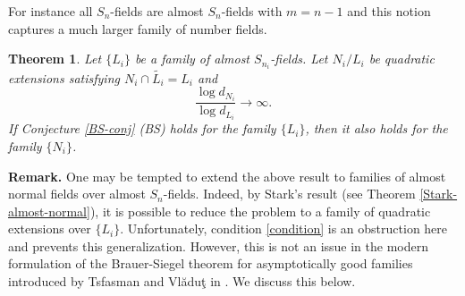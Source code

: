 \documentclass[12pt]{amsart}
\newtheorem{theorem}{Theorem}[section]
\theoremstyle{definition}
\begin{document}
\begin{figure}

\caption{}
\end{figure}

For instance all $S_n$-fields are almost $S_n$-fields with $m=n-1$ and this notion captures a much larger family of number fields.

\begin{theorem}\label{BS-almost-S_n}
   Let $\{L_i\}$ be a family of almost $S_{n_i}$-fields. Let $N_i/L_i$ be quadratic extensions satisfying $N_i\cap \widetilde{L_i} = L_i$ and 
   \begin{equation}\label{condition}
        \frac{\log d_{N_i}}{\log d_{L_i}} \to \infty.
   \end{equation}
    If Conjecture \ref{BS-conj} (BS) holds for the family $\{L_i\}$, then it also holds for the family $\{N_i\}$.
\end{theorem}

{\bf Remark.} One may be tempted to extend the above result to families of almost normal fields over almost $S_n$-fields. Indeed, by Stark's result (see Theorem \ref{Stark-almost-normal}), it is possible to reduce the problem to a family of quadratic extensions over $\{L_i\}$. Unfortunately, condition \eqref{condition} is an obstruction here and prevents this generalization. However, this is not an issue in the modern formulation of the Brauer-Siegel theorem for asymptotically good families introduced by Tsfasman and Vl\u{a}du\c{t} in \cite{TV}. We discuss this below.
\medskip
\end{document}
